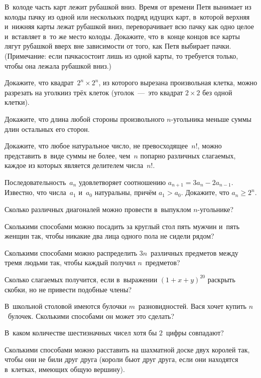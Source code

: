 \documentclass[a4paper,12pt]{article}
\begin{document}
В~колоде часть карт лежит рубашкой вниз. Время от времени Петя вынимает из колоды пачку из одной или нескольких подряд идущих карт, в~которой верхняя и~нижняя карты лежат  рубашкой вниз, переворачивает всю пачку как одно целое и~вставляет в~то же место колоды. Докажите, что в~конце концов все карты лягут рубашкой вверх вне зависимости от того, как Петя выбирает пачки. (Примечание: если  пачка состоит лишь из одной карты, то требуется только, чтобы она лежала рубашкой вниз.)

Докажите, что квадрат~$2^n\times2^n$, из которого вырезана произвольная клетка, можно разрезать на  уголки из трёх клеток ( уголок~---~это квадрат $2\times2$ без одной клетки).

Докажите, что длина любой стороны произвольного $n$-угольника меньше суммы длин остальных его сторон.

Докажите, что любое натуральное число, не превосходящее~$n!$, можно представить в~виде суммы не более, чем~$n$ попарно различных слагаемых, каждое из которых является делителем числа~$n!$.

Последовательность~$a_n$ удовлетворяет соотношению $a_{n+1}=3a_n-2a_{n-1}$. Известно, что числа~$a_1$ и~$a_0$ натуральны, причём $a_1>a_0$. Докажите, что $a_n\geqslant2^n$.


Сколько различных диагоналей можно провести в~выпуклом $n$-угольнике?

Сколькими способами можно посадить за круглый стол пять мужчин и~пять женщин так, чтобы никакие два лица одного пола не сидели рядом?

Сколькими способами можно распределить $3n$~различных предметов между тремя людьми так, чтобы каждый получил $n$~предметов?

Сколько слагаемых получится, если в~выражении $(1+x+y)^{20}$ раскрыть скобки, но не привести подобные члены?

В~школьной столовой имеются булочки $m$~разновидностей. Вася хочет купить $n$~булочек. Сколькими способами он может это сделать?

В~каком количестве шестизначных чисел хотя бы $2$~цифры совпадают?

Сколькими способами можно расставить на шахматной доске двух королей так, чтобы они не били друг друга (короли бьют друг друга, если они находятся в~клетках, имеющих общую вершину).
\end{document}
